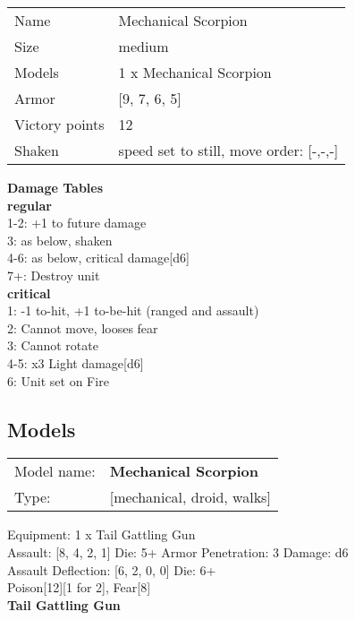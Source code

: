 \begin{tabular}{ll}
  Name & Mechanical Scorpion \\
  Size & medium\\
  Models & 1 x Mechanical Scorpion\\
  Armor & [9, 7, 6, 5]\\
  Victory points & 12\\
  Shaken & speed set to still, move order: [-,-,-]\\
\end{tabular}




{\bf Damage Tables} \\
 {\bf regular } \\
1-2: +1 to future damage \\
3: as below, shaken \\
4-6: as below, critical damage[d6] \\
7+: Destroy unit \\
 {\bf critical } \\
1: -1 to-hit, +1 to-be-hit (ranged and assault) \\
2: Cannot move, looses fear \\
3: Cannot rotate \\
4-5: x3 Light damage[d6] \\
6: Unit set on Fire \\


\clearpage

\subsection{ Models }

\begin{tabular}{ll}
Model name: & {\bf Mechanical Scorpion } \\
Type: & [mechanical, droid, walks] \\
\end{tabular}

Equipment: 1 x Tail Gattling Gun \\

Assault: [8, 4, 2, 1] Die: 5+ Armor Penetration: 3 Damage: d6 \\
Assault Deflection: [6, 2, 0, 0] Die: 6+\\
\indent Poison[12][1 for 2], Fear[8]\\ 
 



{\bf Tail Gattling Gun } \\



